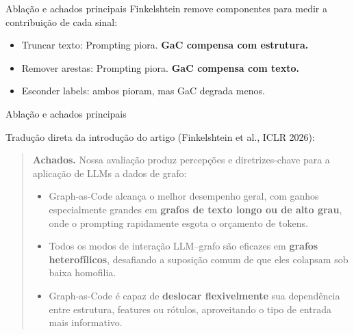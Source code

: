 \documentclass{beamer}
\begin{document}
\begin{frame}{Ablação e achados principais}
  Finkelshtein remove componentes para medir a contribuição de cada sinal:

  \vspace{0.3em}
  \begin{itemize}
    \item Truncar texto: Prompting piora. \textbf{GaC compensa com estrutura.}
    \item Remover arestas: Prompting piora. \textbf{GaC compensa com texto.}
    \item Esconder labels: ambos pioram, mas GaC degrada menos.
  \end{itemize}

\end{frame}

\begin{frame}{Ablação e achados principais}

  \vspace{0.3em}
  {\small Tradução direta da introdução do artigo (Finkelshtein et al., ICLR 2026):}

  \vspace{0.5em}
  \begin{quote}
    \textbf{Achados.} Nossa avaliação produz percepções e diretrizes-chave para a aplicação de LLMs a dados de grafo:

    \vspace{0.3em}
    \begin{itemize}
      \item Graph-as-Code alcança o melhor desempenho geral, com ganhos especialmente grandes em \textbf{grafos de texto longo ou de alto grau}, onde o prompting rapidamente esgota o orçamento de tokens.

      \vspace{0.3em}
      \item Todos os modos de interação LLM--grafo são eficazes em \textbf{grafos heterofílicos}, desafiando a suposição comum de que eles colapsam sob baixa homofilia.

      \vspace{0.3em}
      \item Graph-as-Code é capaz de \textbf{deslocar flexivelmente} sua dependência entre estrutura, features ou rótulos, aproveitando o tipo de entrada mais informativo.
    \end{itemize}
  \end{quote}
\end{frame}
\end{document}
